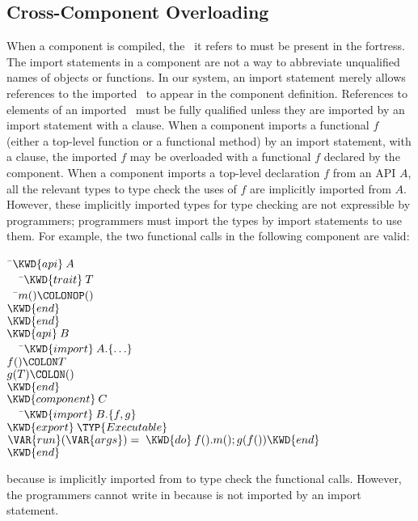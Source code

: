 \subsection{Cross-Component Overloading}
When a component is compiled,
the \apisN\ it refers to must be present in the fortress.
The import statements in a component are not
a way to abbreviate unqualified names of objects or functions.
In our system,
an import statement merely allows references to the imported \apiN\
to appear in the component definition.
References to elements of an imported \apiN\ must be fully qualified
unless they are imported by an import statement with a \KWD{from} clause.
%
When a component imports a functional $f$ (either a top-level function or
a functional method) by an import statement,
with a  clause,
the imported $f$ may be overloaded with a functional $f$ declared by the
component.
When a component imports a top-level declaration $f$ from an API $A$,
all the relevant types to type check the uses of $f$ are implicitly
imported from $A$.  However, these implicitly imported types for type
checking are not expressible by programmers; programmers must import the
types by import statements to use them.  For example, the two
functional calls in the following component  are valid:
%
%
\begin{Fortress}
{\tt~}\pushtabs\=\+\( \KWD{api}\:A\)\\
{\tt~~~}\pushtabs\=\+\(    \KWD{trait}\:T\)\\
{\tt~~}\pushtabs\=\+\(      m()\COLONOP()\)\-\\\poptabs
\(    \KWD{end}\)\-\\\poptabs
\( \KWD{end}\)\\
\( \KWD{api}\:B\)\\
{\tt~~~}\pushtabs\=\+\(    \KWD{import}\:A.\{\ldots\}\)\\[4pt]
\(    f()\COLON T\)\\
\(    g(T)\COLON ()\)\-\\\poptabs
\( \KWD{end}\)\\
\( \KWD{component}\:C\)\\
{\tt~~~}\pushtabs\=\+\(    \KWD{import}\:B.\{f, g\}\)\\
\(    \KWD{export}\:\TYP{Executable}\)\\[4pt]
\(    \VAR{run}(\VAR{args}) = \;\KWD{do}\:f().m(); g(f()) \KWD{end}\)\-\\\poptabs
\( \KWD{end}\)\-\\\poptabs
\end{Fortress}
because  is implicitly imported from  to type check
the functional calls.
However, the programmers cannot write  in  because 
is not imported by an import statement.


